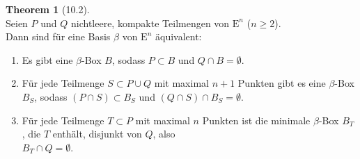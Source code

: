 \documentclass[a4paper,english,16pt]{scrartcl}
\newcommand{\E}{\text{E}} %
\theoremstyle{definition}
\newtheorem*{theorem}{Theorem}
\begin{document}
\begin{framed}
  \begin{theorem}[10.2]\mbox{}\\
    Seien $P$ und $Q$ nichtleere, kompakte Teilmengen von $\E^n$ ($n \geq 2$).\\
    Dann sind für eine Basis $\beta$ von $\E^n$ äquivalent:
    \begin{enumerate}[label=(\alph*)]
      \item Es gibt eine $\beta$-Box $B$, sodass $P \subset B$ und $Q \cap B = \emptyset$.
      \item Für jede Teilmenge $S \subset P {\cup} Q$ mit maximal $n{+}1$ Punkten gibt es eine $\beta$-Box $B_S$, sodass $(P \cap S) \subset B_S$ und $(Q \cap S) \cap B_S = \emptyset$.
      \item Für jede Teilmenge $T \subset P$ mit maximal $n$ Punkten ist die minimale $\beta$-Box $B_T$, die $T$ enthält, disjunkt von $Q$, also \\ $B_T \cap Q = \emptyset$.
    \end{enumerate}
  \end{theorem}
\end{framed}
\end{document}
